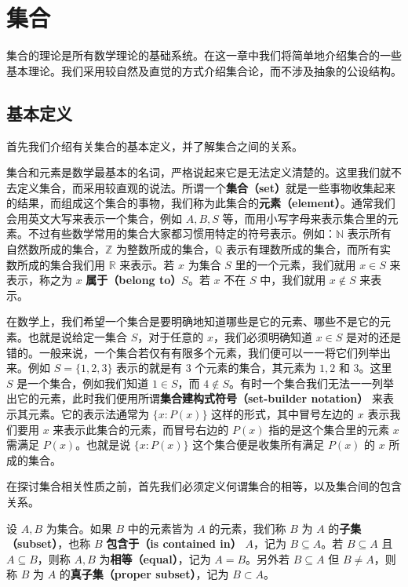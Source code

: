 

\chapter{集合}

集合的理论是所有数学理论的基础系统。在这一章中我们将简单地介绍集合的一些基本理论。我们采用较自然及直觉的方式介绍集合论，而不涉及抽象的公设结构。

\section{基本定义}

首先我们介绍有关集合的基本定义，并了解集合之间的关系。

集合和元素是数学最基本的名词，严格说起来它是无法定义清楚的。这里我们就不去定义集合，而采用较直观的说法。所谓一个\textbf{集合（set）}就是一些事物收集起来的结果，而组成这个集合的事物，我们称为此集合的\textbf{元素（element）}。通常我们会用英文大写来表示一个集合，例如 $A, B, S$ 等，而用小写字母来表示集合里的元素。不过有些数学常用的集合大家都习惯用特定的符号表示。例如：$\mathbb{N}$ 表示所有自然数所成的集合，$\mathbb{Z}$ 为整数所成的集合，$\mathbb{Q}$ 表示有理数所成的集合，而所有实数所成的集合我们用 $\mathbb{R}$ 来表示。若 $x$ 为集合 $S$ 里的一个元素，我们就用 $x \in S$ 来表示，称之为 $x$ \textbf{属于（belong to）}$S$。若 $x$ 不在 $S$ 中，我们就用 $x \notin S$ 来表示。

在数学上，我们希望一个集合是要明确地知道哪些是它的元素、哪些不是它的元素。也就是说给定一集合 $S$，对于任意的 $x$，我们必须明确知道 $x \in S$ 是对的还是错的。一般来说，一个集合若仅有有限多个元素，我们便可以一一将它们列举出来。例如 $S = \{1, 2, 3\}$ 表示的就是有 3 个元素的集合，其元素为 $1, 2$ 和 $3$。这里 $S$ 是一个集合，例如我们知道 $1 \in S$，而 $4 \notin S$。有时一个集合我们无法一一列举出它的元素，此时我们便用所谓\textbf{集合建构式符号（set-builder notation）} 来表示其元素。它的表示法通常为 $\{x : P(x)\}$ 这样的形式，其中冒号左边的 $x$ 表示我们要用 $x$ 来表示此集合的元素，而冒号右边的 $P(x)$ 指的是这个集合里的元素 $x$ 需满足 $P(x)$。也就是说 $\{x : P(x)\}$ 这个集合便是收集所有满足 $P(x)$ 的 $x$ 所成的集合。

在探讨集合相关性质之前，首先我们必须定义何谓集合的相等，以及集合间的包含关系。

\begin{definition}
设 $A, B$ 为集合。如果 $B$ 中的元素皆为 $A$ 的元素，我们称 $B$ 为 $A$ 的{\bf 子集（subset）}，也称 $B$ {\bf 包含于（is contained in）} $A$，记为 $B \subseteq A$。若 $B \subseteq A$ 且 $A \subseteq B$，则称 $A, B$ 为{\bf 相等（equal）}，记为 $A = B$。另外若 $B \subseteq A$ 但 $B \neq A$，则称 $B$ 为 $A$ 的{\bf 真子集（proper subset）}，记为 $B \subset A$。
\end{definition}

